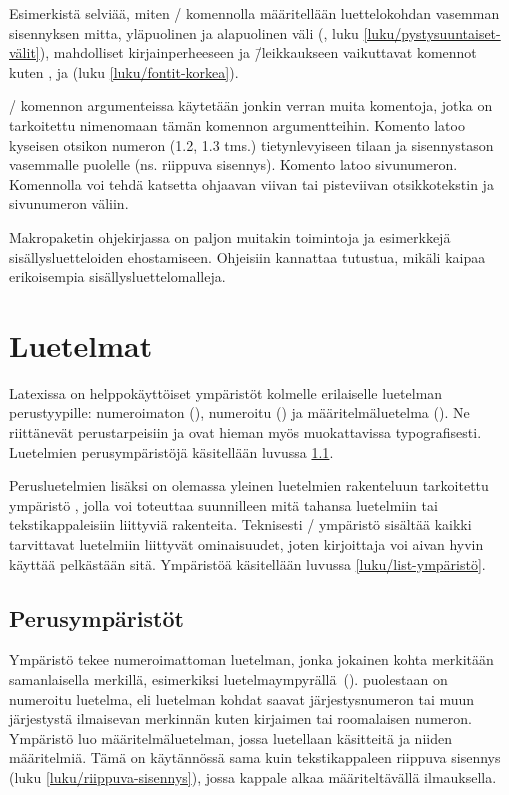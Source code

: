 Esimerkistä selviää, miten \-/ komennolla
määritellään luettelokohdan vasemman sisennyksen mitta, yläpuolinen ja
alapuolinen väli (, luku
\ref{luku/pystysuuntaiset-välit}), mahdolliset kirjainperheeseen ja
\=/leikkaukseen vaikuttavat komennot kuten ,
 ja  (luku \ref{luku/fontit-korkea}).

\-/ komennon argumenteissa käytetään jonkin
verran muita komentoja, jotka on tarkoitettu nimenomaan tämän komennon
argumentteihin. Komento  latoo kyseisen otsikon
numeron (1.2, 1.3 tms.) tietynlevyiseen tilaan ja sisennystason
vasemmalle puolelle (ns. riippuva sisennys). Komento
 latoo sivunumeron. Komennolla 
voi tehdä katsetta ohjaavan viivan tai pisteviivan otsikkotekstin ja
sivunumeron väliin.

Makropaketin  ohjekirjassa on paljon muitakin
toimintoja ja esimerkkejä sisällysluetteloiden ehostamiseen. Ohjeisiin
kannattaa tutustua, mikäli kaipaa erikoisempia sisällysluettelomalleja.

\section{Luetelmat}
\label{luku/luetelmat}

Latexissa on helppokäyttöiset ympäristöt kolmelle erilaiselle luetelman
perustyypille: numeroimaton (), numeroitu
() ja määritelmäluetelma ().
Ne riittänevät perustarpeisiin ja ovat hieman myös muokattavissa
typografisesti. Luetelmien perusympäristöjä käsitellään luvussa
\ref{luku/luetelma-perus}.

Perusluetelmien lisäksi on olemassa yleinen luetelmien rakenteluun
tarkoitettu ympäristö , jolla voi toteuttaa suunnilleen
mitä tahansa luetelmiin tai tekstikappaleisiin liittyviä rakenteita.
Teknisesti \-/ ympäristö sisältää kaikki tarvittavat
luetelmiin liittyvät ominaisuudet, joten kirjoittaja voi aivan hyvin
käyttää pelkästään sitä. Ympäristöä käsitellään luvussa
\ref{luku/list-ympäristö}.

\subsection{Perusympäristöt}
\label{luku/luetelma-perus}

Ympäristö  tekee numeroimattoman luetelman, jonka
jokainen kohta merkitään samanlaisella merkillä, esimerkiksi
luetelmaympyrällä~(\textbullet).  puolestaan on
numeroitu luetelma, eli luetelman kohdat saavat järjestysnumeron tai
muun järjestystä ilmaisevan merkinnän kuten kirjaimen tai roomalaisen
numeron. Ympäristö  luo määritelmäluetelman,
jossa luetellaan käsitteitä ja niiden määritelmiä. Tämä on käytännössä
sama kuin tekstikappaleen riippuva sisennys (luku
\ref{luku/riippuva-sisennys}), jossa kappale alkaa määriteltävällä
ilmauksella.


